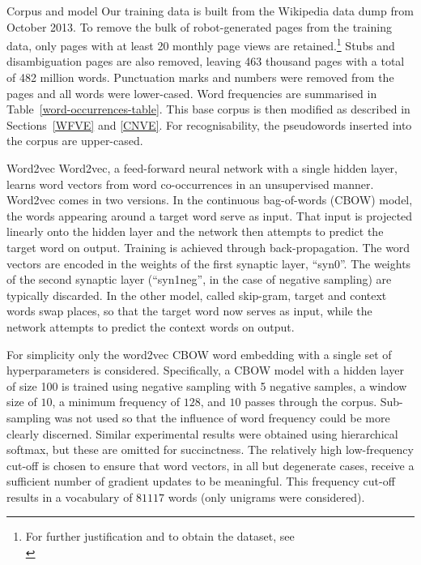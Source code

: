 \documentclass{article} %
\begin{document}
\begin{section}{Corpus and model}\label{corpus-and-model} Our training data is
	built from the Wikipedia data dump from October 2013.  To remove the
	bulk of robot-generated pages from the training data, only pages with
	at least 20 monthly page views are retained.\footnote{For further
	justification and to obtain the dataset, see\\ \blogpost} Stubs and
	disambiguation pages are also removed, leaving 463 thousand pages with
	a total of 482 million words.  Punctuation marks and numbers were
	removed from the pages and all words were lower-cased.  Word
	frequencies are summarised in Table~\ref{word-occurrences-table}.  This
	base corpus is then modified as described in Sections~\ref{WFVE} and
	\ref{CNVE}.  For recognisability, the pseudowords inserted into the
	corpus are upper-cased.

\begin{subsection}{Word2vec}\label{word2vec} Word2vec, a feed-forward neural
	network with a single hidden layer, learns word vectors from word
	co-occurrences in an unsupervised manner.  Word2vec comes in two
	versions.  In the continuous bag-of-words (CBOW) model, the words
	appearing around a target word serve as input.  That input is projected
	linearly onto the hidden layer and the network then attempts to predict
	the target word on output.  Training is achieved through
	back-propagation.  The word vectors are encoded in the weights of the
	first synaptic layer, ``syn0''.  The weights of the second synaptic
	layer (``syn1neg'', in the case of negative sampling) are typically
	discarded.  In the other model, called skip-gram, target and context
	words swap places, so that the target word now serves as input, while
	the network attempts to predict the context words on output.

For simplicity only the word2vec CBOW word embedding with a single set of
hyperparameters is considered.  Specifically, a CBOW model with a hidden layer
of size 100 is trained using negative sampling with 5 negative samples, a
window size of $10$, a minimum frequency of $128$, and $10$ passes through the
corpus.  Sub-sampling was not used so that the influence of word frequency
could be more clearly discerned.  Similar experimental results were obtained
using hierarchical softmax, but these are omitted for succinctness.  The
relatively high low-frequency cut-off is chosen to ensure that word vectors, in
all but degenerate cases, receive a sufficient number of gradient updates to be
meaningful.  This frequency cut-off results in a vocabulary of $81117$ words
(only unigrams were considered).


\end{subsection}
\end{section}
\end{document}
